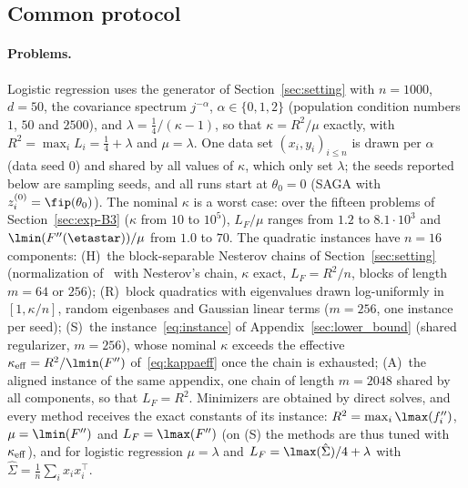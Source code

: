 \subsection{Common protocol}\label{sec:exp-protocol}

\paragraph{Problems.}
Logistic regression uses the generator of Section~\ref{sec:setting} with $n=1000$, $d=50$, the covariance spectrum
$j^{-\alpha}$, $\alpha\in\{0,1,2\}$ (population condition numbers $1$, $50$ and $2500$), and $\lambda=\frac14/(\kappa-1)$,
so that $\kappa=R^2/\mu$ exactly, with $R^2=\max_iL_i=\frac14+\lambda$ and $\mu=\lambda$. One data set $(x_i,y_i)_{i\le n}$ is
drawn per $\alpha$ (data seed $0$) and shared by all values of $\kappa$, which only set $\lambda$; the seeds reported below
are sampling seeds, and all runs start at $\theta_0=0$ (SAGA
with $z_i^{(0)}=\fip(\theta_0)$). The nominal $\kappa$ is a worst case: over the fifteen problems of
Section~\ref{sec:exp-B3} ($\kappa$ from $10$ to $10^5$), $L_F/\mu$ ranges from $1.2$ to $8.1\cdot10^3$ and
$\lmin(F''(\etastar))/\mu$ from $1.0$ to $70$. The quadratic instances have $n=16$ components: (H)~the block-separable
Nesterov chains of Section~\ref{sec:setting} (normalization of~\cite{lan2018optimal} with Nesterov's chain, $\kappa$ exact,
$L_F=R^2/n$, blocks of length $m=64$ or $256$); (R)~block quadratics with eigenvalues drawn log-uniformly in $[1,\kappa/n]$, random
eigenbases and Gaussian linear terms ($m=256$, one instance per seed); (S)~the instance~\eqref{eq:instance} of
Appendix~\ref{sec:lower_bound} (shared regularizer, $m=256$), whose nominal $\kappa$ exceeds the effective
$\kappa_{\rm eff}=R^2/\lmin(F'')$ of~\eqref{eq:kappaeff} once the chain is exhausted; (A)~the aligned instance of the same
appendix, one chain of length $m=2048$ shared by all components, so that $L_F=R^2$. Minimizers are obtained by direct
solves, and every method receives the exact constants of its instance: $R^2=\max_i\lmax(f_i'')$,
$\mu=\lmin(F'')$ and $L_F=\lmax(F'')$ (on (S) the methods are thus tuned with $\kappa_{\rm eff}$), and for
logistic regression $\mu=\lambda$ and $L_F=\lmax(\hat\Sigma)/4+\lambda$ with $\hat\Sigma=\frac1n\sum_ix_ix_i^\top$.

